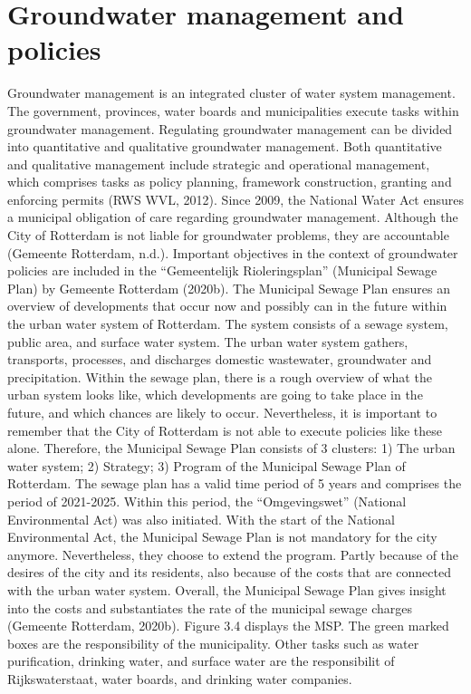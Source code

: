 \section{Groundwater management and policies} 
Groundwater management is an integrated cluster of water system management. The government, provinces, water boards and municipalities execute tasks within groundwater management. Regulating groundwater management can be divided into quantitative and qualitative groundwater management. Both quantitative and qualitative management include strategic and operational management, which comprises tasks as policy planning, framework construction, granting and enforcing  permits (RWS WVL, 2012). Since 2009, the National Water Act ensures a municipal obligation of care regarding groundwater management. Although the City of Rotterdam is not liable for groundwater problems, they are accountable (Gemeente Rotterdam, n.d.). Important objectives in the context of groundwater policies are included in the “Gemeentelijk Rioleringsplan” (Municipal Sewage Plan) by Gemeente Rotterdam (2020b). The Municipal Sewage Plan ensures an overview of developments that occur now and possibly can in the future within the urban water system of Rotterdam. The system consists of a sewage system, public area, and surface water system. The urban water system gathers, transports, processes, and discharges domestic wastewater, groundwater and precipitation. Within the sewage plan, there is a rough overview of what the urban system looks like, which developments are going to take place in the future, and which chances are likely to occur. Nevertheless, it is important to remember that the City of Rotterdam is not able to execute policies like these alone. Therefore, the Municipal Sewage Plan consists of 3 clusters: 1) The urban water system; 2) Strategy; 3) Program of the Municipal Sewage Plan of Rotterdam. The sewage plan has a valid time period of 5 years and comprises the period of 2021-2025. Within this period, the “Omgevingswet” (National Environmental Act) was also initiated. With the start of the National Environmental Act, the Municipal Sewage Plan is not mandatory for the city anymore. Nevertheless, they choose to extend the program. Partly because of the desires of the city and its residents, also because of the costs that are connected with the urban water system. Overall, the Municipal Sewage Plan gives insight into the costs and substantiates the rate of the municipal sewage charges (Gemeente Rotterdam, 2020b). Figure 3.4 displays the MSP.  The green marked boxes are the responsibility of the municipality. Other tasks such as water purification, drinking water, and surface water are the responsibilit of Rijkswaterstaat, water boards, and drinking water companies. 

